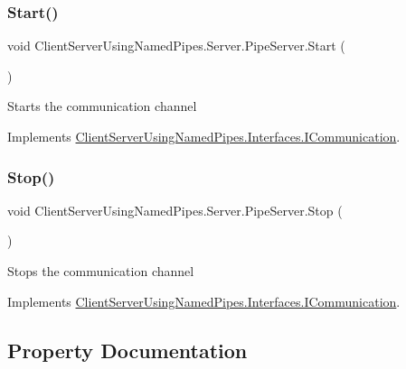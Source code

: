 \subsubsection{\texorpdfstring{Start()}{Start()}}
{\footnotesize\ttfamily void Client\+Server\+Using\+Named\+Pipes.\+Server.\+Pipe\+Server.\+Start (\begin{DoxyParamCaption}{ }\end{DoxyParamCaption})\hspace{0.3cm}{\ttfamily [inline]}}



Starts the communication channel 



Implements \hyperlink{interface_client_server_using_named_pipes_1_1_interfaces_1_1_i_communication_ac06ad36a2b8a02d82e385e0eade28671}{Client\+Server\+Using\+Named\+Pipes.\+Interfaces.\+I\+Communication}.

\mbox{\label{class_client_server_using_named_pipes_1_1_server_1_1_pipe_server_a37eb41a1b69ab108b9eb5745950b3ab9}} 
\subsubsection{\texorpdfstring{Stop()}{Stop()}}
{\footnotesize\ttfamily void Client\+Server\+Using\+Named\+Pipes.\+Server.\+Pipe\+Server.\+Stop (\begin{DoxyParamCaption}{ }\end{DoxyParamCaption})\hspace{0.3cm}{\ttfamily [inline]}}



Stops the communication channel 



Implements \hyperlink{interface_client_server_using_named_pipes_1_1_interfaces_1_1_i_communication_a85ce939996cde20d398e799ca6a900f3}{Client\+Server\+Using\+Named\+Pipes.\+Interfaces.\+I\+Communication}.



\subsection{Property Documentation}
\mbox{\label{class_client_server_using_named_pipes_1_1_server_1_1_pipe_server_a3a8a8b1c5a1434d181390d875fab1945}} 
